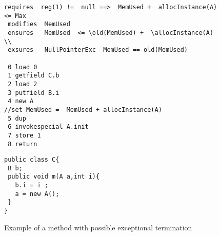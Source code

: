 \begin{figure}[!hbp]


\begin{minipage}[c]{\linewidth}

\begin{lstlisting}[frame=trbl]
 requires  reg(1) !=  null ==>  MemUsed +  allocInstance(A) <= Max 
 modifies  MemUsed 
 ensures   MemUsed  <= \old(MemUsed) +  \allocInstance(A) \\
 exsures   NullPointerExc  MemUsed == old(MemUsed)

 0 load 0
 1 getfield C.b
 2 load 2
 3 putfield B.i
 4 new A 
//set MemUsed =  MemUsed + allocInstance(A)
 5 dup
 6 invokespecial A.init
 7 store 1
 8 return
\end{lstlisting}

\end{minipage}


\begin{minipage}[c]{\linewidth}

\begin{lstlisting}[frame=trbl]
public class C{
 B b;
 public void m(A a,int i){
   b.i = i ;
   a = new A();
 }
}
\end{lstlisting}

\end{minipage}

\caption{\sc Example of a method with possible exceptional termination}
\label{excMeth}
\end{figure}
